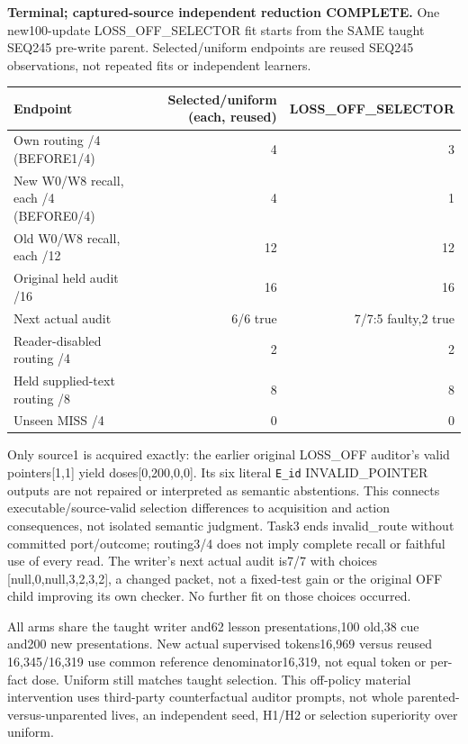 \documentclass[11pt]{article}
\begin{document}
\textbf{Terminal; captured-source independent reduction COMPLETE.}
One new100-update LOSS\_OFF\_SELECTOR fit starts from the SAME taught SEQ245
pre-write parent. Selected/uniform endpoints are reused SEQ245 observations,
not repeated fits or independent learners.

\begin{center}
\small
\begin{tabular}{lrr}
\toprule
Endpoint & Selected/uniform (each, reused) & LOSS\_OFF\_SELECTOR \\
\midrule
Own routing /4 (BEFORE1/4) & 4 & 3 \\
New W0/W8 recall, each /4 (BEFORE0/4) & 4 & 1 \\
Old W0/W8 recall, each /12 & 12 & 12 \\
Original held audit /16 & 16 & 16 \\
Next actual audit & 6/6 true & 7/7:5 faulty,2 true \\
Reader-disabled routing /4 & 2 & 2 \\
Held supplied-text routing /8 & 8 & 8 \\
Unseen MISS /4 & 0 & 0 \\
\bottomrule
\end{tabular}
\end{center}

Only source1 is acquired exactly: the earlier original LOSS\_OFF auditor's
valid pointers[1,1] yield doses[0,200,0,0]. Its six literal \texttt{E\_id}
INVALID\_POINTER outputs are not repaired or interpreted as semantic abstentions.
This connects executable/source-valid selection differences to acquisition and
action consequences, not isolated semantic judgment. Task3 ends invalid\_route
without committed port/outcome; routing3/4 does not imply complete recall or
faithful use of every read. The writer's next actual audit is7/7 with choices
[null,0,null,3,2,3,2], a changed packet, not a fixed-test gain or the original
OFF child improving its own checker. No further fit on those choices occurred.

All arms share the taught writer and62 lesson presentations,100 old,38 cue
and200 new presentations. New actual supervised tokens16,969 versus reused
16,345/16,319 use common reference denominator16,319, not equal token or per-fact
dose. Uniform still matches taught selection. This off-policy material
intervention uses third-party counterfactual auditor prompts, not whole
parented-versus-unparented lives, an independent seed, H1/H2 or selection
superiority over uniform.
\end{document}
